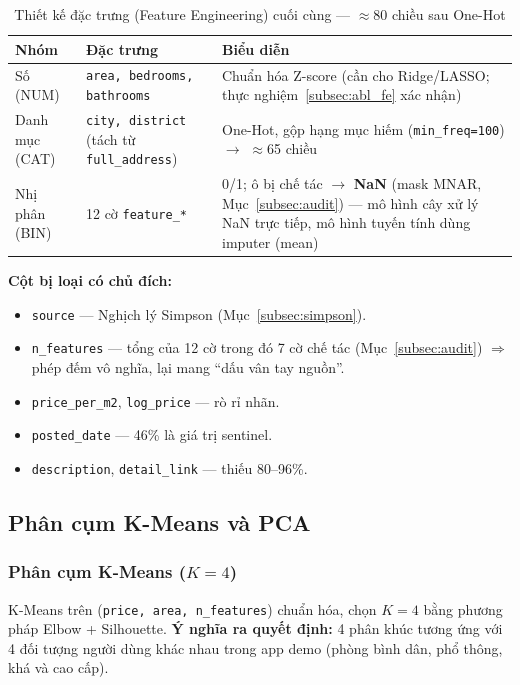 \begin{table}[H]
  \centering
  \caption{Thiết kế đặc trưng (Feature Engineering) cuối cùng — $\approx$80 chiều sau One-Hot}
  \label{tab:features}
  \begin{tabularx}{\textwidth}{@{}l X X@{}}
    \toprule
    \textbf{Nhóm} & \textbf{Đặc trưng} & \textbf{Biểu diễn} \\
    \midrule
    Số (NUM) &
      \texttt{area, bedrooms, bathrooms} &
      Chuẩn hóa Z-score
      (cần cho Ridge/LASSO; thực nghiệm~\ref{subsec:abl_fe} xác nhận) \\
    Danh mục (CAT) &
      \texttt{city, district} (tách từ \texttt{full\_address}) &
      One-Hot, gộp hạng mục hiếm (\texttt{min\_freq=100})
      $\to$ $\approx$65 chiều \\
    Nhị phân (BIN) &
      12 cờ \texttt{feature\_*} &
      0/1; ô bị chế tác $\to$ \textbf{NaN} (mask MNAR, Mục~\ref{subsec:audit}) —
      mô hình cây xử lý NaN trực tiếp, mô hình tuyến tính dùng imputer (mean) \\
    \bottomrule
  \end{tabularx}
\end{table}

\textbf{Cột bị loại có chủ đích:}
\begin{itemize}[leftmargin=*, itemsep=2pt]
  \item \texttt{source} — Nghịch lý Simpson (Mục~\ref{subsec:simpson}).
  \item \texttt{n\_features} — tổng của 12 cờ trong đó 7 cờ chế tác
        (Mục~\ref{subsec:audit}) $\Rightarrow$ phép đếm vô nghĩa,
        lại mang ``dấu vân tay nguồn''.
  \item \texttt{price\_per\_m2}, \texttt{log\_price} — rò rỉ nhãn.
  \item \texttt{posted\_date} — 46\% là giá trị sentinel.
  \item \texttt{description}, \texttt{detail\_link} — thiếu 80--96\%.
\end{itemize}

\subsection{Phân cụm K-Means và PCA}
\label{subsec:clustering}

\subsubsection*{Phân cụm K-Means ($K = 4$)}

K-Means trên (\texttt{price, area, n\_features}) chuẩn hóa, chọn $K=4$
bằng phương pháp Elbow + Silhouette.
\textbf{Ý nghĩa ra quyết định:} 4 phân khúc tương ứng với 4 đối tượng
người dùng khác nhau trong app demo (phòng bình dân, phổ thông, khá và cao cấp).

